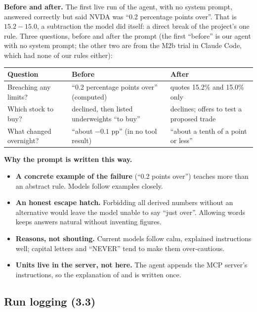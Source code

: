 \documentclass[11pt]{article}
\newcommand{\code}[1]{\texttt{\detokenize{#1}}}
\begin{document}
\textbf{Before and after.} The first live run of the agent, with no system prompt, answered
correctly but said NVDA was ``0.2 percentage points over''. That is $15.2 - 15.0$, a
subtraction the model did itself: a direct break of the project's one rule. Three questions,
before and after the prompt (the first ``before'' is our agent with no system prompt; the
other two are from the M2b trial in Claude Code, which had none of our rules either):

\begin{center}
\begin{tabularx}{\textwidth}{@{}l X X@{}}
\toprule
\textbf{Question} & \textbf{Before} & \textbf{After} \\
\midrule
Breaching any limits? & ``0.2 percentage points over'' (computed) & quotes 15.2\% and 15.0\% only \\
Which stock to buy? & declined, then listed underweights ``to buy'' & declines; offers to test a proposed trade \\
What changed overnight? & ``about $-0.1$ pp'' (in no tool result) & ``about a tenth of a point or less'' \\
\bottomrule
\end{tabularx}
\end{center}

\textbf{Why the prompt is written this way.}

\begin{itemize}
  \item \textbf{A concrete example of the failure} (``0.2 points over'') teaches more than an
        abstract rule. Models follow examples closely.
  \item \textbf{An honest escape hatch.} Forbidding all derived numbers without an alternative
        would leave the model unable to say ``just over''. Allowing words keeps answers
        natural without inventing figures.
  \item \textbf{Reasons, not shouting.} Current models follow calm, explained instructions
        well; capital letters and ``NEVER'' tend to make them over-cautious.
  \item \textbf{Units live in the server, not here.} The agent appends the MCP server's
        instructions, so the explanation of \code{_pct} and \code{_usd} is written once.
\end{itemize}

\subsection{Run logging (3.3)}
\end{document}
